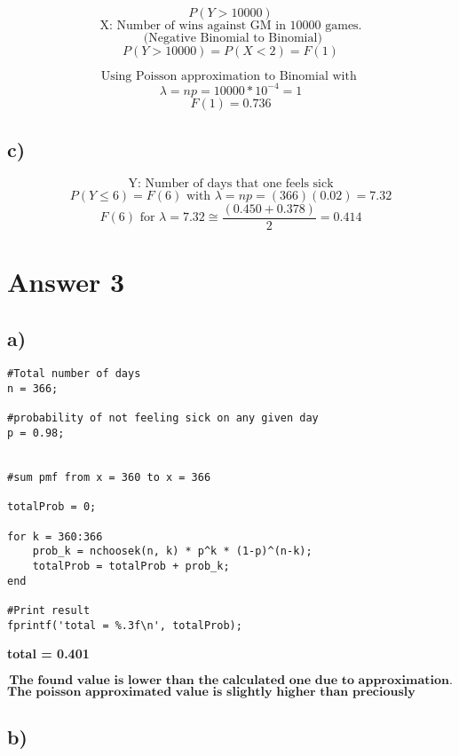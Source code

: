 \documentclass[12pt]{article}
\begin{document}
\[ P(Y > 10000) \]
\[ \text{X: Number of wins against GM in 10000 games.} \]
\[ \text{ (Negative Binomial to Binomial)} \] 
\[ P(Y > 10000 ) = P(X < 2) = F(1) \] 

\[ \text{Using Poisson approximation to Binomial with } \]
\[ \lambda = np = 10000 * 10^{-4} = 1 \]
\[ F(1) = 0.736\]


\subsection*{c)} 
\[ \text{Y: Number of days that one feels sick} \]
\[ P(Y \le 6) = F(6) \text{ with } \lambda = np = (366)(0.02) = 7.32\]
\[ F(6) \text{ for } \lambda = 7.32  \cong \frac{ (0.450 + 0.378)}{2} = 0.414 \]

\section*{Answer 3}
\subsection*{a)} 

\begin{lstlisting}
#Total number of days
n = 366; 

#probability of not feeling sick on any given day
p = 0.98; 


#sum pmf from x = 360 to x = 366

totalProb = 0;

for k = 360:366
    prob_k = nchoosek(n, k) * p^k * (1-p)^(n-k);
    totalProb = totalProb + prob_k;
end

#Print result
fprintf('total = %.3f\n', totalProb);

\end{lstlisting}

\textbf{total = 0.401}

\[ \textbf{The found value is lower than the calculated one due to approximation.}\]
\[ \textbf{The poisson approximated value is slightly higher than preciously calculated Binomial value.}\]
\subsection*{b)} 
\end{document}

